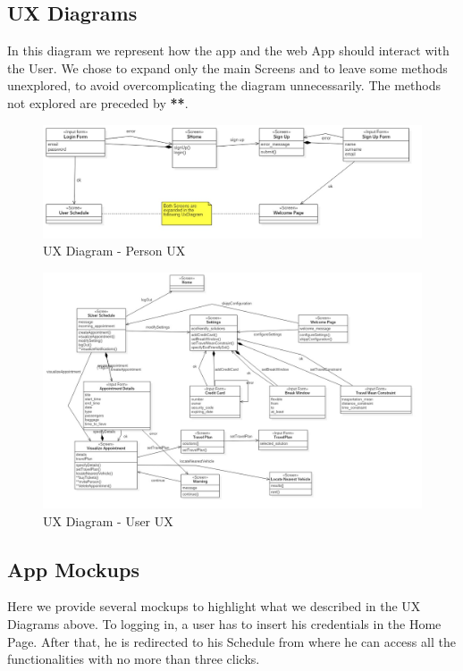 \subsection{UX Diagrams}
In this diagram we represent how the app and the web App should interact with the User. We chose to expand only the main Screens and to leave some methods unexplored, to avoid overcomplicating the diagram unnecessarily. The methods not explored are preceded by \textbf{**}.

	\begin{figure}[H]	
		\centerline{\includegraphics[width=0.9\paperwidth]{Images/UxPerson}}
		\caption{UX Diagram - Person UX}
	\end{figure}	
	\begin{figure}[H]	
		\centerline{\includegraphics[width=0.9\paperwidth]{Images/UxUser}}
		\caption{UX Diagram - User UX}
	\end{figure}

\subsection{App Mockups}
Here we provide several mockups to highlight what we described in the UX Diagrams above. To logging in, a user has to insert his credentials in the Home Page. After that, he is redirected to his Schedule from where he can access all the functionalities with no more than three clicks.

